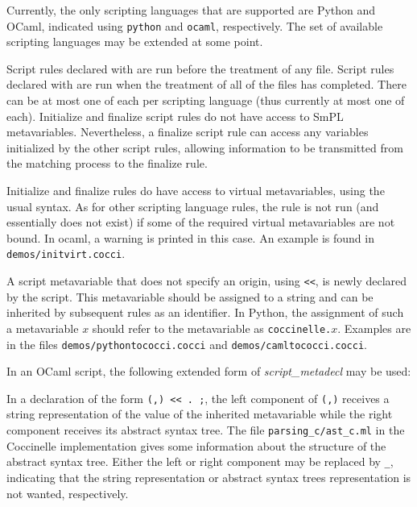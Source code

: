 Currently, the only scripting languages that are supported are Python and
OCaml, indicated using {\tt python} and {\tt ocaml}, respectively.  The
set of available scripting languages may be extended at some point.

Script rules declared with  are run before the treatment of
any file.  Script rules declared with  are run when the
treatment of all of the files has completed.  There can be at most one of
each per scripting language (thus currently at most one of each).
Initialize and finalize script rules do not have access to SmPL
metavariables.  Nevertheless, a finalize script rule can access any
variables initialized by the other script rules, allowing information to be
transmitted from the matching process to the finalize rule.

Initialize and finalize rules do have access to virtual metavariables,
using the usual syntax.  As for other scripting language rules, the rule
is not run (and essentially does not exist) if some of the required virtual
metavariables are not bound.  In ocaml, a warning is printed in this case.
An example is found in {\tt demos/initvirt.cocci}.

A script metavariable that does not specify an origin, using \texttt{<<},
is newly declared by the script.  This metavariable should be assigned to a
string and can be inherited by subsequent rules as an identifier.  In
Python, the assignment of such a metavariable $x$ should refer to the
metavariable as {\tt coccinelle.\(x\)}.  Examples are in the files
\texttt{demos/pythontococci.cocci} and \texttt{demos/camltococci.cocci}.

In an OCaml script, the following extended form of \textit{script\_metadecl}
may be used:

\begin{grammar}
\end{grammar}

\noindent
In a declaration of the form \texttt{(,) <{}<
  . ;}, the left component of \texttt{(,)}
receives a string representation of the value of the inherited metavariable
while the right component receives its abstract syntax tree.  The file
\texttt{parsing\_c/ast\_c.ml} in the Coccinelle implementation gives some
information about the structure of the abstract syntax tree.  Either the
left or right component may be replaced by \verb+_+, indicating that the
string representation or abstract syntax trees representation is not
wanted, respectively.

